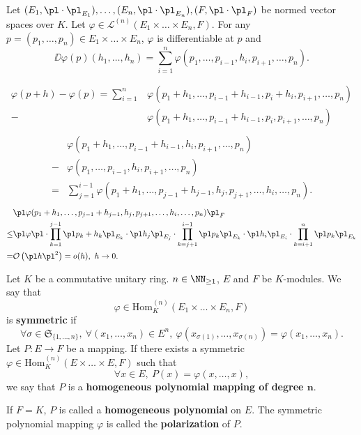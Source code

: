 \begin{theoremenv}
    Let $(E_1,\pl\cdot\pl_{E_1}),\ldots,(E_n,\pl\cdot\pl_{E_n}),(F,\pl\cdot\pl_F)$ be normed vector spaces over $K$.
    Let $\varphi\in \mathscr{L}^{(n)}(E_1\times\ldots\times E_n,F)$. For any $p=(p_1,\ldots,p_n)\in E_1\times \ldots\times E_n$, $\varphi$ is differentiable at $p$ and
    $$\DD \varphi(p)(h_1,\ldots,h_n)=\sum_{i=1}^n \varphi(p_1,\ldots,p_{i-1},h_i,p_{i+1},\ldots,p_n).$$
\end{theoremenv}
\begin{proofenv}
    \begin{align*}
        \varphi(p+h)-\varphi(p)=\sum_{i=1}^n & \varphi(p_1+h_1,\ldots,p_{i-1}+h_{i-1},p_{i}+h_i,p_{i+1},\ldots,p_n)\\
        -&\varphi(p_1+h_1,\ldots,p_{i-1}+h_{i-1},p_{i},p_{i+1},\ldots,p_n)\\
    \end{align*}
    \begin{align*}
        & \varphi(p_1+h_1,\ldots,p_{i-1}+h_{i-1},h_i,p_{i+1},\ldots,p_n)\\
        -& \varphi(p_1,\ldots,p_{i-1},h_i,p_{i+1},\ldots,p_n)\\
        =&\sum_{j=1}^{i-1}\varphi (p_1+h_1,\ldots,p_{j-1}+h_{j-1},h_j,p_{j+1},\ldots,h_i,\ldots,p_n).
    \end{align*}
    \begin{align*}
        &\pl \varphi(p_1+h_1,\ldots,p_{j-1}+h_{j-1},h_j,p_{j+1},\ldots,h_i,\ldots,p_n)\pl_F\\
        \le &\pl \varphi\pl \cdot \prod_{\substack{k=1}}^{j-1} \pl p_k+h_k\pl_{E_k}\cdot\pl h_j\pl_{E_j}\cdot \prod_{k=j+1}^{i-1}\pl p_k\pl_{E_k}\cdot \pl h_i\pl_{E_i} \cdot \prod_{\substack{k=i+1}}^{n}\pl p_k\pl_{E_k}\\
        =&\mathcal{O}\left(\pl h\pl^2\right)=o(h),\ h\rightarrow 0.
    \end{align*}
\end{proofenv}
\begin{definitionenv}
    Let $K$ be a commutative unitary ring. $n\in\NN_{\ge1}$, $E$ and $F$ be $K$-modules. We say that 
    $$\varphi\in \mathrm{Hom}_{K}^{(n)}(E_1\times\ldots\times E_n,F)$$
    is \textbf{symmetric} if
    $$\forall \sigma\in \mathfrak{S}_{\{1,\ldots,n\}},\ \forall (x_1,\ldots,x_n)\in E^n,\ \varphi(x_{\sigma(1)},\ldots,x_{\sigma(n)})=\varphi(x_1,\ldots,x_n).$$
    Let $P:E\longrightarrow F$ be a mapping. If there exists a symmetric $\varphi\in \mathrm{Hom}_{K}^{(n)}(E\times\ldots\times E,F)$ such that
    $$\forall x\in E,\ P(x)=\varphi(x,\ldots,x),$$
    we say that $P$ is a \textbf{homogeneous polynomial mapping of degree $\mathbf{n}$}.

    If $F=K$, $P$ is called a \textbf{homogeneous polynomial} on $E$. The symmetric polynomial mapping $\varphi$ is called the \textbf{polarization} of $P$.
\end{definitionenv}
